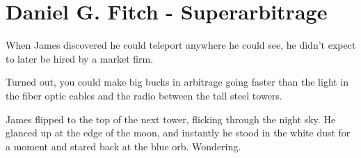 \hypertarget{daniel-g.-fitch---superarbitrage}{%
\section{Daniel G. Fitch -
Superarbitrage}\label{daniel-g.-fitch---superarbitrage}}

When James discovered he could teleport anywhere he could see, he didn't
expect to later be hired by a market firm.

Turned out, you could make big bucks in arbitrage going faster than the
light in the fiber optic cables and the radio between the tall steel
towers.

James flipped to the top of the next tower, flicking through the night
sky. He glanced up at the edge of the moon, and instantly he stood in
the white dust for a moment and stared back at the blue orb. Wondering.
